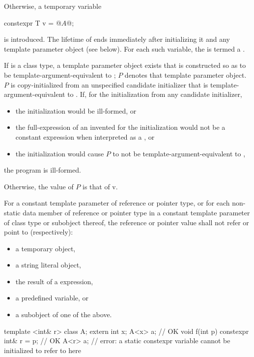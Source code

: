 \pnum
Otherwise, a temporary variable
\begin{codeblock}
constexpr T v = @$A$@;
\end{codeblock}
is introduced.
The lifetime of  ends immediately after initializing it and
any template parameter object (see below).
For each such variable,
the  
is termed a .

\pnum
If  is a class type,
a template parameter object exists
that is constructed so as to be template-argument-equivalent to ;
$P$ denotes that template parameter object.
$P$ is copy-initialized from an unspecified candidate initializer
that is template-argument-equivalent to .
If, for the initialization from any candidate initializer,
\begin{itemize}
\item
the initialization would be ill-formed, or
\item
the full-expression of an invented 
for the initialization would not be a constant expression
when interpreted as a , or
\item
the initialization would cause $P$ to not be template-argument-equivalent to ,
\end{itemize}
the program is ill-formed.

\pnum
Otherwise, the value of $P$ is that of v.

\pnum
For a constant template parameter of reference or pointer type,
or for each non-static data member of reference or pointer type
in a constant template parameter of class type or subobject thereof,
the reference or pointer value shall not refer
or point to (respectively):
\begin{itemize}
\item a temporary object,
\item a string literal object,
\item the result of a  expression,
\item a predefined  variable, or
\item a subobject of one of the above.
\end{itemize}

\pnum
\begin{example}
\begin{codeblock}
template <int& r> class A{};
extern int x;
A<x> a;                 // OK
void f(int p) {
  constexpr int& r = p; // OK
  A<r> a;               // error: a static constexpr  variable cannot be initialized to refer to  here
}
\end{codeblock}
\end{example}

